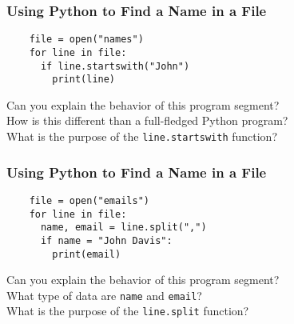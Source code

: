 \documentclass[14pt,aspectratio=169]{beamer}
\begin{document}
%
\begin{frame}[fragile]
  \frametitle{Using Python to Find a Name in a File}
  \normalsize
  \hspace*{-.65in}
  \begin{minipage}{6in}
    \vspace*{.25in}
    \begin{verbatim}
    file = open("names")
    for line in file:
      if line.startswith("John")
        print(line)
    \end{verbatim}
  \end{minipage}
  \vspace*{.25in}
  \begin{center}
    \normalsize \noindent Can you explain the behavior of this program segment? \\
    \normalsize \noindent How is this different than a full-fledged Python program? \\
    \normalsize \noindent What is the purpose of the {\tt line.startswith} function? \\
  \end{center}
\end{frame}

%
\begin{frame}[fragile]
  \frametitle{Using Python to Find a Name in a File}
  \normalsize
  \hspace*{-.65in}
  \begin{minipage}{6in}
    \vspace*{.25in}
    \begin{verbatim}
    file = open("emails")
    for line in file:
      name, email = line.split(",")
      if name = "John Davis":
        print(email)
    \end{verbatim}
  \end{minipage}
  \vspace*{.25in}
  \begin{center}
    \normalsize \noindent Can you explain the behavior of this program segment? \\
    \normalsize \noindent What type of data are {\tt name} and {\tt email}? \\
    \normalsize \noindent What is the purpose of the {\tt line.split} function? \\
  \end{center}
\end{frame}
\end{document}
